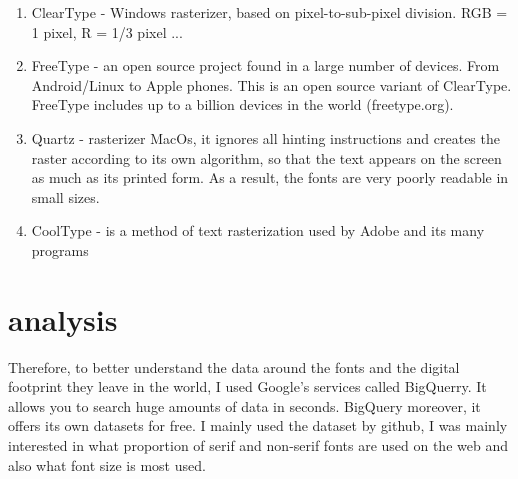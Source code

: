 \documentclass[a4paper]{article}
\begin{document}
\begin{enumerate}
\item ClearType - Windows rasterizer, based on pixel-to-sub-pixel division. RGB = 1 pixel, R = 1/3 pixel ...

\item FreeType - an open source project found in a large number of devices. From Android/Linux to Apple phones. This is an open source variant of ClearType. FreeType includes up to a billion devices in the world (freetype.org).

\item Quartz - rasterizer MacOs, it ignores all hinting instructions and creates the raster according to its own algorithm, so that the text appears on the screen as much as its printed form. As a result, the fonts are very poorly readable in small sizes.

\item CoolType - is a method of text rasterization used by Adobe and its many programs
\end{enumerate}

\section{analysis}
Therefore, to better understand the data around the fonts and the digital footprint they leave in the world, I used Google's services called BigQuerry. It allows you to search huge amounts of data in seconds. BigQuery 
moreover, it offers its own datasets for free. I mainly used the dataset  by github, I was mainly interested in what proportion of serif and non-serif fonts are used on the web and also what font size is most used.
\end{document}
